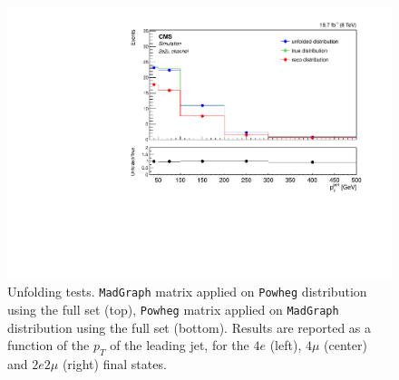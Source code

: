 \begin{figure}[hbtp]
\begin{center}
    \includegraphics[width=0.8\cmsFigWidth]{Figures/Unfolding/MCTests/PtJet1_ZZTo2e2m_PowMatrix_MadDistr_FullSample_fr}  
 \caption{Unfolding tests. \texttt{MadGraph} matrix applied on \texttt{Powheg} distribution using the full set (top), \texttt{Powheg} matrix applied on \texttt{MadGraph} distribution using the full set (bottom). Results are reported as a function of  the $p_T$ of the leading jet, for the $4e$ (left), $4\mu$ (center) and $2e2\mu$ (right) final states.}
    \label{fig:MCtest_PtJet12}
  \end{center}
\end{figure}
\clearpage
